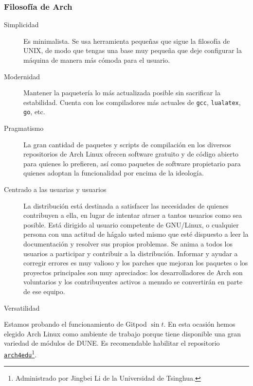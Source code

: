 \begin{frame}
	\frametitle{Filosofía de Arch}

	\begin{description}
		\item[Simplicidad]
			Es minimalista.
			Se usa herramienta pequeñas que sigue la filosofía de UNIX, de modo que tengas una base muy pequeña que deje configurar la máquina de manera más cómoda para el usuario.
		\item[Modernidad]
			Mantener la paquetería lo más actualizada posible sin sacrificar la estabilidad. Cuenta con los compiladores más actuales de \lstinline{gcc}, \lstinline{lualatex}, \lstinline{go}, etc.
		\item[Pragmatismo]
			La gran cantidad de paquetes y scripts de compilación en los diversos repositorios de Arch Linux ofrecen software gratuito y de código abierto para quienes lo prefieren, así como paquetes de software propietario para quienes adoptan la funcionalidad por encima de la ideología.
		\item[Centrado a las usuarias y usuarios]
			La distribución está destinada a satisfacer las necesidades de quienes contribuyen a ella, en lugar de intentar atraer a tantos usuarios como sea posible.
			Está dirigido al usuario competente de GNU/Linux, o cualquier persona con una actitud de hágalo usted mismo que esté dispuesto a leer la documentación y resolver sus propios problemas.
			Se anima a todos los usuarios a participar y contribuir a la distribución.
			Informar y ayudar a corregir errores es muy valioso y los parches que mejoran los paquetes o los proyectos principales son muy apreciados: los desarrolladores de Arch son voluntarios y los contribuyentes activos a menudo se convertirán en parte de ese equipo.
		\item[Versatilidad]
	\end{description}

\end{frame}

\begin{frame}
	Estamos probando el funcionamiento de Gitpod $\sin{t}$.
	En esta ocasión hemos elegido Arch Linux como ambiente de trabajo porque tiene disponible una gran variedad de módulos de DUNE.
	Es recomendable habilitar el repositorio \href{https://wiki.archlinux.org/title/Unofficial\_user\_repositories\#arch4edu}{\texttt{arch4edu}}\footnote{Administrado por Jingbei Li de la Universidad de Tsinghua.}.
\end{frame}

